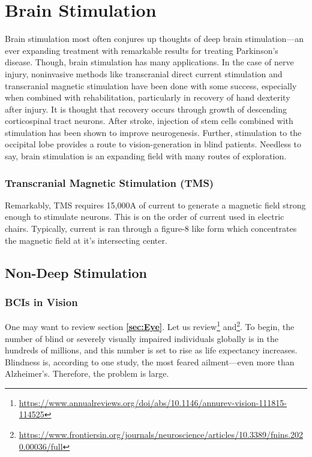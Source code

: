 \chapter{Brain Stimulation}

Brain stimulation most often conjures up thoughts of deep brain stimulation---an ever expanding treatment with remarkable results for treating Parkinson's disease. Though, brain stimulation has many applications. In the case of nerve injury, noninvasive methods like transcranial direct current stimulation and transcranial magnetic stimulation have been done with some success, especially when combined with rehabilitation, particularly in recovery of hand dexterity after injury. It is thought that recovery occurs through growth of descending corticospinal tract neurons. After stroke, injection of stem cells combined with stimulation has been shown to improve neurogenesis. Further, stimulation to the occipital lobe provides a route to vision-generation in blind patients. Needless to say, brain stimulation is an expanding field with many routes of exploration. 

\subsection{Transcranial Magnetic Stimulation (TMS)}

Remarkably, TMS requires 15,000A of current to generate a magnetic field strong enough to stimulate neurons. This is on the order of current used in electric chairs. Typically, current is ran through a figure-8 like form which concentrates the magnetic field at it's intersecting center. 

\section{Non-Deep Stimulation}

\subsection{BCIs in Vision}


One may want to review section \textbf{\ref{sec:Eye}}. Let us review\footnote{\url{https://www.annualreviews.org/doi/abs/10.1146/annurev-vision-111815-114525}} and\footnote{\url{https://www.frontiersin.org/journals/neuroscience/articles/10.3389/fnins.2020.00036/full}}. To begin, the number of blind or severely visually impaired individuals globally is in the hundreds of millions, and this number is set to rise as life expectancy increases. Blindness is, according to one study, the most feared ailment---even more than Alzheimer's. Therefore, the problem is large. \newline

